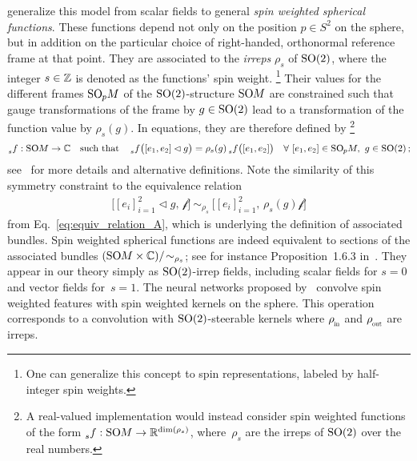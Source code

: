 \citet{esteves2020spinweighted} generalize this model from scalar fields to general \emph{spin weighted spherical functions}.
These functions depend not only on the position $p\in S^2$ on the sphere, but in addition on the particular choice of right-handed, orthonormal reference frame at that point.
They are associated to the \emph{irreps} $\rho_s$ of $\operatorname{SO}(2)$, where the integer $s\in\mathbb{Z}$ is denoted as the functions' spin weight.%
\footnote{
    One can generalize this concept to spin representations, labeled by half-integer spin weights.
}
Their values for the different frames $\operatorname{SO}_{\mkern-1.1mu p}\mkern-3.2muM$ of the $\operatorname{SO}(2)$-structure $\operatorname{SO}\mkern-3.6muM$ are constrained such that gauge transformations of the frame by $g\in\operatorname{SO}(2)$ lead to a transformation of the function value by $\rho_s(g)$.
In equations, they are therefore defined by%
\footnote{
    A real-valued implementation would instead consider spin weighted functions of the form $\prescript{}{s}f: \operatorname{SO}\mkern-3.6muM \to \mathbb{R}^{\dim(\rho_s)}$, where~$\rho_s$ are the irreps of $\operatorname{SO}(2)$ over the real numbers.
}
\begin{align}
    \prescript{}{s}f: \operatorname{SO}\mkern-3.6muM \to \mathbb{C}
    \ \ \ \textup{such that} \ \ \
    \prescript{}{s}f\big( [e_1,e_2] \lhd g \big) = \rho_s(g) \prescript{}{s}f \big( [e_1,e_2] \big)
    \ \ \ \forall\ [e_1,e_2] \in \operatorname{SO}_{\mkern-1.1mu p}\mkern-3.2muM,\ g\in\operatorname{SO}(2) \,;\!
\end{align}
see~\cite{boyle2016should} for more details and alternative definitions.
Note the similarity of this symmetry constraint to the equivalence relation
\begin{align}
    \big[ [e_i]_{i=1}^2 \lhd g,\, \mathscr{f} \big]\ \sim_{\rho_s}\ \big[ [e_i]_{i=1}^2,\, \rho_s(g) \mathscr{f} \big]
\end{align}
from Eq.~\eqref{eq:equiv_relation_A}, which is underlying the definition of associated bundles.
Spin weighted spherical functions are indeed equivalent to sections of the associated bundles
$(\operatorname{SO}\mkern-3.6muM \times \mathbb{C})/\!\sim_{\rho_s}$;
see for instance Proposition~1.6.3 in~\cite{wendlLectureNotesBundles2008}.
They appear in our theory simply as $\operatorname{SO}(2)$-irrep fields, including scalar fields for $s=0$ and vector fields for~$s=1$.
The neural networks proposed by~\citet{esteves2020spinweighted} convolve spin weighted features with spin weighted kernels on the sphere.
This operation corresponds to a convolution with $\operatorname{SO}(2)$-steerable kernels where $\rhoin$ and $\rhoout$ are irreps.


